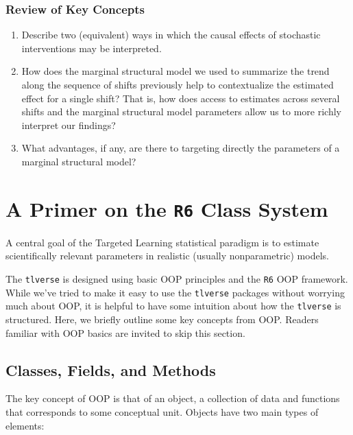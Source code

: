 \documentclass[12pt, krantz2,]{krantz}
\theoremstyle{definition}
\theoremstyle{definition}
\theoremstyle{definition}
\newcommand{\1}{\mathbbm{1}}
\begin{document}
\hypertarget{review-of-key-concepts-2}{%
\subsubsection{Review of Key Concepts}\label{review-of-key-concepts-2}}

\begin{enumerate}
\def\labelenumi{\arabic{enumi}.}
\item
  Describe two (equivalent) ways in which the causal effects of stochastic
  interventions may be interpreted.
\item
  How does the marginal structural model we used to summarize the trend along
  the sequence of shifts previously help to contextualize the estimated effect
  for a single shift? That is, how does access to estimates across several
  shifts and the marginal structural model parameters allow us to more richly
  interpret our findings?
\item
  What advantages, if any, are there to targeting directly the parameters of a
  marginal structural model?
\end{enumerate}

\hypertarget{r6}{%
\section{\texorpdfstring{A Primer on the \texttt{R6} Class System}{A Primer on the R6 Class System}}\label{r6}}

A central goal of the Targeted Learning statistical paradigm is to estimate
scientifically relevant parameters in realistic (usually nonparametric) models.

The \texttt{tlverse} is designed using basic OOP principles and the \texttt{R6} OOP framework.
While we've tried to make it easy to use the \texttt{tlverse} packages without worrying
much about OOP, it is helpful to have some intuition about how the \texttt{tlverse} is
structured. Here, we briefly outline some key concepts from OOP. Readers
familiar with OOP basics are invited to skip this section.

\hypertarget{classes-fields-and-methods}{%
\subsection{Classes, Fields, and Methods}\label{classes-fields-and-methods}}

The key concept of OOP is that of an object, a collection of data and functions
that corresponds to some conceptual unit. Objects have two main types of
elements:
\end{document}
